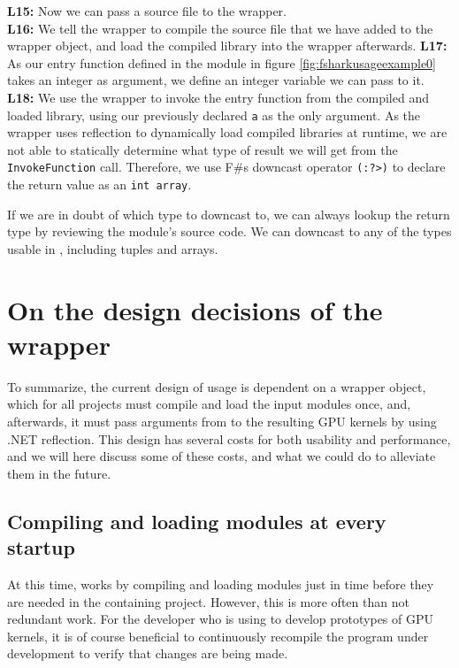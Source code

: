 \textbf{L15:} Now we can pass a source file to the \fshark{} wrapper. \\
\textbf{L16:} We tell the wrapper to compile the source file that we have added
to the wrapper object, and load the compiled library into the wrapper
afterwards.
\textbf{L17:} As our entry function defined in the module in figure
\ref{fig:fsharkusageexample0} takes an integer as argument, we define an integer
variable we can pass to it.
\textbf{L18:} We use the wrapper to invoke the entry function from the compiled
and loaded library, using our previously declared \texttt{a} as the only
argument. As the \fshark{} wrapper uses reflection to dynamically load compiled
libraries at runtime, we are not able to statically determine what type of
result we will get from the \texttt{InvokeFunction} call. Therefore, we use F\#s
downcast operator \texttt{(:?>)} to declare the return value as an \texttt{int
  array}.

If we are in doubt of which type to downcast to, we can always lookup the return
type by reviewing the \fshark{} module's source code. We can downcast to any of
the types usable in \fsharp{}, including tuples and arrays.

\section{On the design decisions of the \fshark{} wrapper}
To summarize, the current design of \fshark{} usage is dependent on a
wrapper object, which for all \fshark{} projects must compile and load 
the input \fshark{} modules once, and, afterwards, it must pass arguments 
from \fsharp{} to the resulting GPU kernels by using .NET reflection.
This design has several costs for both usability and performance, and we will
here discuss some of these costs, and what we could do to alleviate them in the
future.

\subsection{Compiling and loading \fshark{} modules at every startup}
At this time, \fshark{} works by compiling and loading \fshark{} modules just in
time before they are needed in the containing \fsharp{} project. However, this
is more often than not redundant work. For the developer who is using \fshark{} to develop
prototypes of \fshark{} GPU kernels, it is of course beneficial to continuously
recompile the \fshark{} program under development to verify that changes are being
made.

